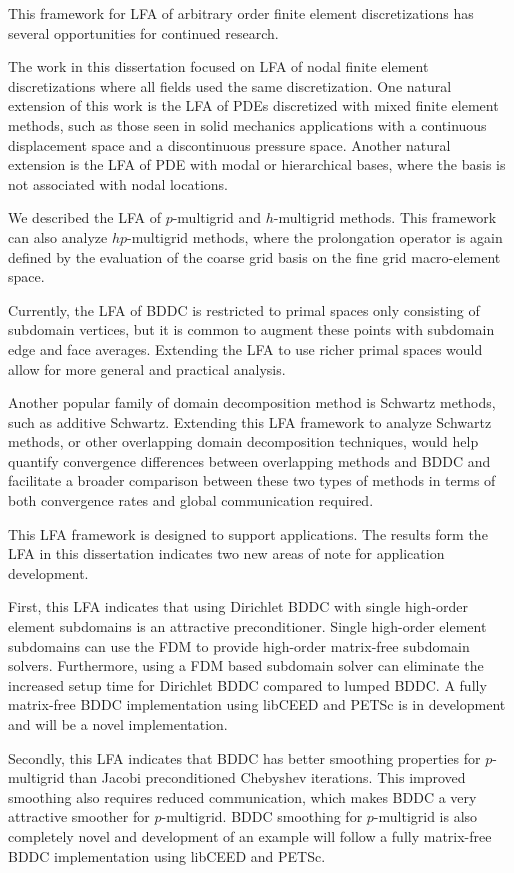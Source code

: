 This framework for LFA of arbitrary order finite element discretizations has several opportunities for continued research.

The work in this dissertation focused on LFA of nodal finite element discretizations where all fields used the same discretization.
One natural extension of this work is the LFA of PDEs discretized with mixed finite element methods, such as those seen in solid mechanics applications with a continuous displacement space and a discontinuous pressure space.
Another natural extension is the LFA of PDE with modal or hierarchical bases, where the basis is not associated with nodal locations.

We described the LFA of $p$-multigrid and $h$-multigrid methods.
This framework can also analyze $hp$-multigrid methods, where the prolongation operator is again defined by the evaluation of the coarse grid basis on the fine grid macro-element space.

Currently, the LFA of BDDC is restricted to primal spaces only consisting of subdomain vertices, but it is common to augment these points with subdomain edge and face averages.
Extending the LFA to use richer primal spaces would allow for more general and practical analysis.

Another popular family of domain decomposition method is Schwartz methods, such as additive Schwartz.
Extending this LFA framework to analyze Schwartz methods, or other overlapping domain decomposition techniques, would help quantify convergence differences between overlapping methods and BDDC and facilitate a broader comparison between these two types of methods in terms of both convergence rates and global communication required.

This LFA framework is designed to support applications.
The results form the LFA in this dissertation indicates two new areas of note for application development.

First, this LFA indicates that using Dirichlet BDDC with single high-order element subdomains is an attractive preconditioner.
Single high-order element subdomains can use the FDM to provide high-order matrix-free subdomain solvers.
Furthermore, using a FDM based subdomain solver can eliminate the increased setup time for Dirichlet BDDC compared to lumped BDDC.
A fully matrix-free BDDC implementation using libCEED and PETSc is in development and will be a novel implementation.

Secondly, this LFA indicates that BDDC has better smoothing properties for $p$-multigrid than Jacobi preconditioned Chebyshev iterations.
This improved smoothing also requires reduced communication, which makes BDDC a very attractive smoother for $p$-multigrid.
BDDC smoothing for $p$-multigrid is also completely novel and development of an example will follow a fully matrix-free BDDC implementation using libCEED and PETSc.
